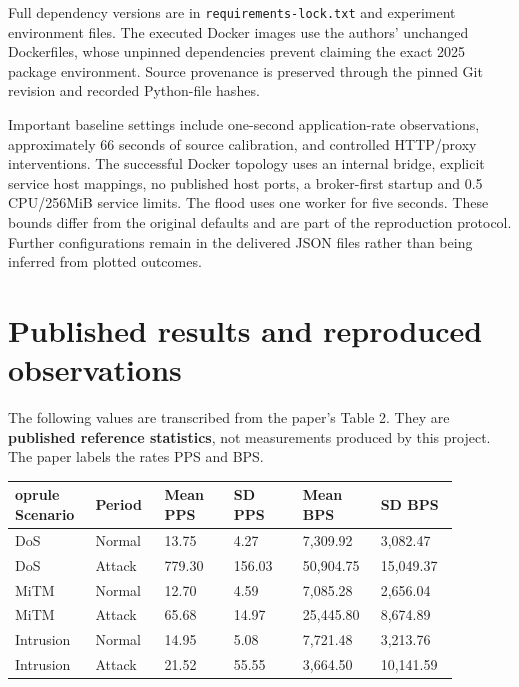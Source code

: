 \documentclass[11pt,a4paper]{article}
\begin{document}
Full dependency versions are in \texttt{requirements-lock.txt} and experiment environment files. The executed Docker images use the authors' unchanged Dockerfiles, whose unpinned dependencies prevent claiming the exact 2025 package environment. Source provenance is preserved through the pinned Git revision and recorded Python-file hashes.


Important baseline settings include one-second application-rate observations, approximately 66 seconds of source calibration, and controlled HTTP/proxy interventions. The successful Docker topology uses an internal bridge, explicit service host mappings, no published host ports, a broker-first startup and 0.5 CPU/256MiB service limits. The flood uses one worker for five seconds. These bounds differ from the original defaults and are part of the reproduction protocol. Further configurations remain in the delivered JSON files rather than being inferred from plotted outcomes.


\section{Published results and reproduced observations}

The following values are transcribed from the paper's Table 2. They are \textbf{published reference statistics}, not measurements produced by this project. The paper labels the rates PPS and BPS.


\begingroup\small\setlength{\tabcolsep}{3pt}\begin{longtable}{p{0.14666666666666667\linewidth}p{0.14666666666666667\linewidth}p{0.14666666666666667\linewidth}p{0.14666666666666667\linewidth}p{0.14666666666666667\linewidth}p{0.14666666666666667\linewidth}}	oprule
Scenario & Period & Mean PPS & SD PPS & Mean BPS & SD BPS \\
\midrule\endhead
DoS & Normal & 13.75 & 4.27 & 7,309.92 & 3,082.47 \\
DoS & Attack & 779.30 & 156.03 & 50,904.75 & 15,049.37 \\
MiTM & Normal & 12.70 & 4.59 & 7,085.28 & 2,656.04 \\
MiTM & Attack & 65.68 & 14.97 & 25,445.80 & 8,674.89 \\
Intrusion & Normal & 14.95 & 5.08 & 7,721.48 & 3,213.76 \\
Intrusion & Attack & 21.52 & 55.55 & 3,664.50 & 10,141.59 \\
\bottomrule\end{longtable}\endgroup
\end{document}
